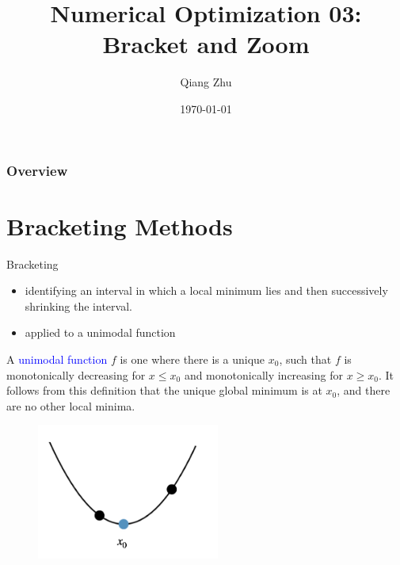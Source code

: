 \documentclass{beamer}
\title[Optimization]{Numerical Optimization 03: Bracket and Zoom} %
\author{Qiang Zhu} %
\institute[University of Nevada Las Vegas] %
{
University of Nevada Las Vegas\\ %
\medskip
}
\date{\today} %
\begin{document}
\begin{frame}
\titlepage %
\end{frame}

\begin{frame}
\frametitle{Overview} %
\tableofcontents %
\end{frame}



\section{Bracketing Methods}
\begin{frame}{Bracketing}
\begin{itemize}
    \item identifying an interval in which a local minimum lies and then successively shrinking the interval.
    \item applied to a unimodal function
\end{itemize}
A \textcolor{blue}{unimodal function} $f$ is one where there is a unique $x_0$, such that $f$ is monotonically decreasing for $x \leq x_0$ and monotonically increasing for $x \geq x_0$. It follows from this definition that the unique global minimum is at $x_0$, and there are no other local minima.
\begin{figure}
\centering
\includegraphics[width=60mm]{Figs/unimodal.jpeg}
\end{figure}
\end{frame}
\end{document}
